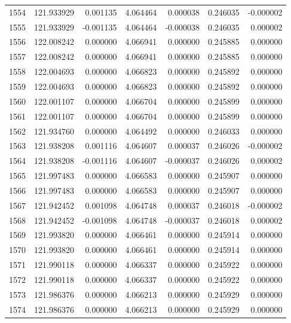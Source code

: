 \begin{tabular}{rrrrrrr}
1554 & 121.933929 &    0.001135 &  4.064464 &   0.000038 &   0.246035 & -0.000002 \\
1555 & 121.933929 &   -0.001135 &  4.064464 &  -0.000038 &   0.246035 &  0.000002 \\
1556 & 122.008242 &    0.000000 &  4.066941 &   0.000000 &   0.245885 &  0.000000 \\
1557 & 122.008242 &    0.000000 &  4.066941 &   0.000000 &   0.245885 &  0.000000 \\
1558 & 122.004693 &    0.000000 &  4.066823 &   0.000000 &   0.245892 &  0.000000 \\
1559 & 122.004693 &    0.000000 &  4.066823 &   0.000000 &   0.245892 &  0.000000 \\
1560 & 122.001107 &    0.000000 &  4.066704 &   0.000000 &   0.245899 &  0.000000 \\
1561 & 122.001107 &    0.000000 &  4.066704 &   0.000000 &   0.245899 &  0.000000 \\
1562 & 121.934760 &    0.000000 &  4.064492 &   0.000000 &   0.246033 &  0.000000 \\
1563 & 121.938208 &    0.001116 &  4.064607 &   0.000037 &   0.246026 & -0.000002 \\
1564 & 121.938208 &   -0.001116 &  4.064607 &  -0.000037 &   0.246026 &  0.000002 \\
1565 & 121.997483 &    0.000000 &  4.066583 &   0.000000 &   0.245907 &  0.000000 \\
1566 & 121.997483 &    0.000000 &  4.066583 &   0.000000 &   0.245907 &  0.000000 \\
1567 & 121.942452 &    0.001098 &  4.064748 &   0.000037 &   0.246018 & -0.000002 \\
1568 & 121.942452 &   -0.001098 &  4.064748 &  -0.000037 &   0.246018 &  0.000002 \\
1569 & 121.993820 &    0.000000 &  4.066461 &   0.000000 &   0.245914 &  0.000000 \\
1570 & 121.993820 &    0.000000 &  4.066461 &   0.000000 &   0.245914 &  0.000000 \\
1571 & 121.990118 &    0.000000 &  4.066337 &   0.000000 &   0.245922 &  0.000000 \\
1572 & 121.990118 &    0.000000 &  4.066337 &   0.000000 &   0.245922 &  0.000000 \\
1573 & 121.986376 &    0.000000 &  4.066213 &   0.000000 &   0.245929 &  0.000000 \\
1574 & 121.986376 &    0.000000 &  4.066213 &   0.000000 &   0.245929 &  0.000000 \\

\end{tabular}
